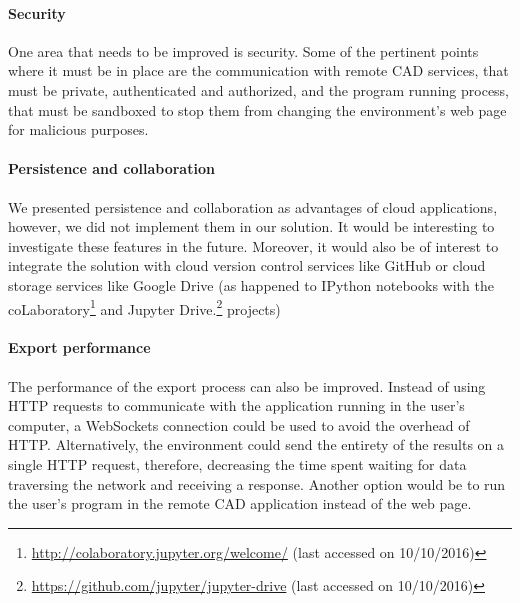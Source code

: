 \paragraph{Security}
One area that needs to be improved is security.
Some of the pertinent points where it must be in place are the communication with remote CAD services, that must be private, authenticated and authorized, and the program running process, that must be sandboxed to stop them from changing the environment's web page for malicious purposes.

\paragraph{Persistence and collaboration}
We presented persistence and collaboration as advantages of cloud applications, however, we did not implement them in our solution.
It would be interesting to investigate these features in the future.
Moreover, it would also be of interest to integrate the solution with cloud version control services like GitHub or cloud storage services like Google Drive (as happened to IPython notebooks with the coLaboratory\footnote{\url{http://colaboratory.jupyter.org/welcome/} (last accessed on 10/10/2016)} and Jupyter Drive.\footnote{\url{https://github.com/jupyter/jupyter-drive} (last accessed on 10/10/2016)} projects)

\paragraph{Export performance}
The performance of the export process can also be improved.
Instead of using HTTP requests to communicate with the application running in the user's computer, a WebSockets connection\cite{rfc6455} could be used to avoid the overhead of HTTP.
Alternatively, the environment could send the entirety of the results on a single HTTP request, therefore, decreasing the time spent waiting for data traversing the network and receiving a response.
Another option would be to run the user's program in the remote CAD application instead of the web page.









